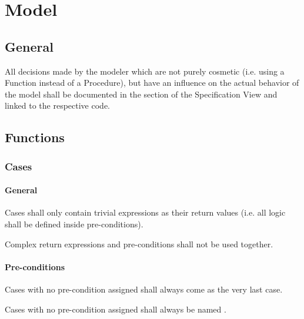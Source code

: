 \documentclass[draft]{efsguide}
\begin{document}
\chapter{Model}

\section{General}

\begin{rules}
\item \label{rule:model_general_design_choices} All decisions made by the modeler which are not purely cosmetic (i.e. using a Function instead of a Procedure), but have an influence on the actual behavior of the model shall be documented in the section  of the Specification View and linked to the respective code. 

\end{rules}


\section{Functions}
\subsection{Cases}

\subsubsection{General}
\begin{rules}
\item \label{rule:functions_cases_general_trivialexpressions} Cases shall only contain trivial expressions as their return values (i.e. all logic shall be defined inside pre-conditions). 
\item {} Complex return expressions and pre-conditions shall not be used together.  
\end{rules}

\subsubsection{Pre-conditions}
\begin{rules}
\item Cases with no pre-condition assigned shall always come as the very last case. 
\item Cases with no pre-condition assigned shall always be named . 
\end{rules}
\end{document}
